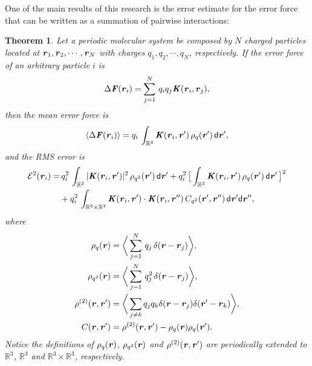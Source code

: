 \documentclass[aps,pre,preprint,unsortedaddress]{revtex4}
\renewcommand{\v}[1]{\textbf{\textit{#1}}}
\renewcommand{\d}[1]{\textsf{#1}}
\newtheorem{theorem}{Theorem}[section]
\begin{document}
One of the main results of this research is the error estimate for
the error force that can be written as a summation of
pairwise interactions:
\begin{theorem}\label{thm:tmp1}
  Let a periodic molecular system be composed by $N$ charged particles
  located at $\v r_1, \v r_2, \cdots, \v r_N$ with charges $q_1, q_2,
  \cdots, q_N$, respectively.
  If the error force of an arbitrary particle $i$ is
  \begin{align}\label{eqn:thm-error-force}
    \Delta \v F(\v r_i) =
    \sum_{j=1}^N\,q_iq_j \v K(\v r_i, \v r_j),
  \end{align}
  then the mean error force is
  \begin{align}\label{eqn:thm-meanf}
    \langle\Delta\v F(\v r_i)\rangle
    =q_i\, \int_{\mathbb R^3}\v K (\v r_i,\v r')\,\rho_q(\v r')\,\d d\v r',
  \end{align}
  and the RMS error is
  \begin{align}\nonumber
    \mathcal E^2 (\v r_i) 
    = &\,
    q_i^2\,\int_{\mathbb R^3}\vert\v K(\v r_i,\v r')\vert^2\,\rho_{q^2} (\v r')\,\d d\v r' + 
    q_i^2\,
    \big[
    \int_{\mathbb R^3}\v K(\v r_i,\v r')\,\rho_{q}(\v r')\,\d d\v r'
    \,\big]^2
    \\\label{eqn:thm-error}
    &+
    q_i^2\,\int_{\mathbb R^3\times\mathbb R^3}
    \v K(\v r_i,\v r')\cdot
    \v K(\v r_i,\v r'')\,
    C_{q^2}(\v r', \v r'')\,
    \d d\v r'\d d\v r'',
  \end{align}
  where
  \begin{align}\label{eqn:def-rhoq}
    \rho_q(\v r)
    &= 
    \bigg\langle
    \sum_{j = 1}^N
    \,q_j\,\delta(\v r - \v r_j)
    \bigg\rangle,\\\label{eqn:def-rhoq2}
    \rho_{q^2}(\v r)
    &= 
    \bigg\langle
    \sum_{j = 1}^N
    \,q^2_j\,\delta(\v r - \v r_j)
    \bigg\rangle,\\\label{eqn:def-rho2}
    \rho^{(2)}(\v r, \v r')
    &= 
    \bigg\langle
    \sum_{j\neq k}
    q_jq_k\delta(\v r-\v r_j)\delta(\v r'-\v r_k)
    \bigg\rangle,\\\label{eqn:def-c}
    C(\v r, \v r')
    &=
    \rho^{(2)}(\v r, \v r')    
    - \rho_q(\v r)\rho_q(\v r').
  \end{align}
  Notice the definitions of $\rho_q(\v r)$, $\rho_{q^2}(\v r)$ and
  $\rho^{(2)}(\v r, \v r')$ are periodically extended to
  $\mathbb{R}^3$, $\mathbb{R}^3$ and $\mathbb{R}^3\times\mathbb R^3$,
  respectively.
\end{theorem}
\end{document}
